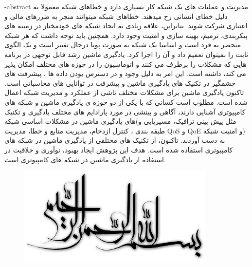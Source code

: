 
\fa-abstract{
مدیریت و عملیات های یک شبکه کار بسیاری دارد و خطاهای شبکه معمولا به دلیل خطای انسانی رخ میدهند. خطاهای شبکه میتوانند منجر به ضررهای مالی و اعتباری شرکت شوند. بنابراین، علاقه زیادی به ایجاد شبکه های خودمختار در زمینه های پیکربندی، ترمیم، بهینه سازی و امنیت وجود دارد. همچنین باید توجه داشت که هر شبکه منحصر به فرد است و اساسا یک شبکه به صورت پویا درحال تغییر است و یک الگوی ثابت را نمیتوان تعمیم داد و آن را اجرا کرد.
یادگیری ماشین رشد قابل توجهی در برنامه هایی که مشکلات را برطرف می کنند و اتوماسیون را در حوزه های مختلف امکان پذیر می کند، داشته است. این امر به دلیل وجود و در دسترس بودن داده ها ، پیشرفت های چشمگیر در تکنیک های یادگیری ماشین و پیشرفت در توانایی های محاسباتی است. 
تاکنون یادگیری ماشین برای مشکلات مختلف ناشی از عملکرد و مدیریت شبکه اعمال شده است. مطلوب است کسانی که با یکی از دو حوزه ی یادگیری ماشین و شبکه های کامپیوتری آشنایی دارند، آگاهی و بینشی در مورد پارادایم های مختلف یادگیری و تکنیک های یادگیری ماشین در مشکلات اساسی شبکه(مثل پیش بینی ترافیک، مسیریابی و طبقه بندی ، کنترل ازدحام، مدیریت منابع و خطا، مدیریت QoS و QoE و امنیت شبکه) به دست آوردند.
تاکنون، از تکنیک های مختلفی از یادگیری ماشین در شبکه های کامپیوتری استفاده شده است. هدف این پژوهش ایجاد بهبود، نوآوری و خلاقیت در استفاده از یادگیری ماشین در شبکه های کامپیوتری است.
}





\AUTtitle
\vspace*{7cm}
\thispagestyle{empty}
\begin{center}
\includegraphics[height=5cm,width=12cm]{besm}
\end{center}